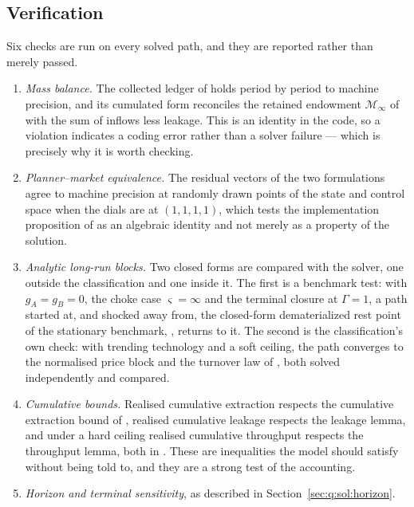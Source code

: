 \subsection{Verification}\label{sec:q:sol:verification}

Six checks are run on every solved path, and they are reported rather than merely passed.
\begin{enumerate}
\item \emph{Mass balance.} The collected ledger of  holds period by period to machine precision, and its cumulated form reconciles the retained endowment $\mathcal M_\infty$ of  with the sum of inflows less leakage. This is an identity in the code, so a violation indicates a coding error rather than a solver failure --- which is precisely why it is worth checking.
\item \emph{Planner--market equivalence.} The residual vectors of the two formulations agree to machine precision at randomly drawn points of the state and control space when the dials are at $\left(1,1,1,1\right)$, which tests the implementation proposition of \theorynote{} as an algebraic identity and not merely as a property of the solution.
\item \emph{Analytic long-run blocks.} Two closed forms are compared with the solver, one outside the classification and one inside it. The first is a benchmark test: with $g_A=g_B=0$, the choke case $\varsigma=\infty$ and the terminal closure at $\Gamma=1$, a path started at, and shocked away from, the closed-form dematerialized rest point of the stationary benchmark, , returns to it. The second is the classification's own check: with trending technology and a soft ceiling, the path converges to the normalised price block and the turnover law of , both solved independently and compared.
\item \emph{Cumulative bounds.} Realised cumulative extraction respects the cumulative extraction bound of , realised cumulative leakage respects the leakage lemma, and under a hard ceiling realised cumulative throughput respects the throughput lemma, both in . These are inequalities the model should satisfy without being told to, and they are a strong test of the accounting.
\item \emph{Horizon and terminal sensitivity}, as described in Section~\ref{sec:q:sol:horizon}.

\end{enumerate}
